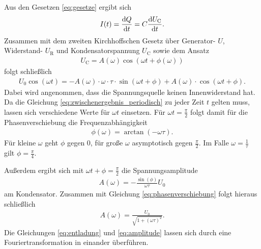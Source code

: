 \noindent
Aus den Gesetzen \eqref{eq:gesetze} ergibt sich 
\begin{align}
    I(t) = \frac{\mathop{}\!\mathrm{d}{Q}}{\mathop{}\!\mathrm{d}{t}} = C \frac{\mathop{}\!\mathrm{d}{U_\text{C}}}{\mathop{}\!\mathrm{d}{t}}.
    \label{eq:stromstaerke}
\end{align}
Zusammen mit dem zweiten Kirchhoffschen Gesetz über Generator- $U$, Widerstand- $U_\text{R}$ und Kondensatorspannung $U_\text{C}$ sowie dem Ansatz 
\begin{align}
    U_\text{C} = A(\omega) \cos\left(\omega t + \phi(\omega)\right)
\end{align}
folgt schließlich 
\begin{align}
    U_0 \cos(\omega t) = -A(\omega) \cdot \omega \cdot \tau \cdot \sin\left(\omega t + \phi\right) + A(\omega) \cdot \cos\left(\omega t + \phi\right).
    \label{eq:zwischenergebnis_periodisch}
\end{align}
Dabei wird angenommen, dass die Spannungsquelle keinen Innenwiderstand hat.
Da die Gleichung \eqref{eq:zwischenergebnis_periodisch} zu jeder Zeit $t$ gelten muss,
lassen sich verschiedene Werte für $\omega t$ einsetzen.
Für $\omega t = \frac{\pi}{2}$ folgt damit für die Phasenverschiebung die Frequenzabhängigkeit
\begin{align}
    \phi(\omega) = \arctan(- \omega \tau).
    \label{eq:phasenverschiebung}
\end{align}
Für kleine $\omega$ geht $\phi$ gegen 0, für große $\omega$ asymptotisch gegen $\frac{\pi}{2}$.
Im Falle $\omega = \frac{1}{\tau}$ gilt $\phi = \frac{\pi}{4}$.

\noindent
Außerdem ergibt sich mit $\omega t + \phi = \frac{\pi}{2}$ die Spannungsamplitude
\begin{align}
    A(\omega) = - \frac{\sin(\phi)}{\omega \tau} U_0
\end{align}
am Kondensator.
Zusammen mit Gleichung \eqref{eq:phasenverschiebung} folgt hieraus schließlich
\begin{align}
    A(\omega) = \frac{U_0}{\sqrt{1+ (\omega \tau)^2}}.
    \label{eq:amplitude}
\end{align}
Die Gleichungen \eqref{eq:entladung} und \eqref{eq:amplitude} lassen sich durch eine Fouriertransformation in einander überführen.